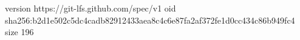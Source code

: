 version https://git-lfs.github.com/spec/v1
oid sha256:b2d1e502c5dc4cadb82912433aea8c4c6e87fa2af372fe1d0cc434c86b949fc4
size 196

